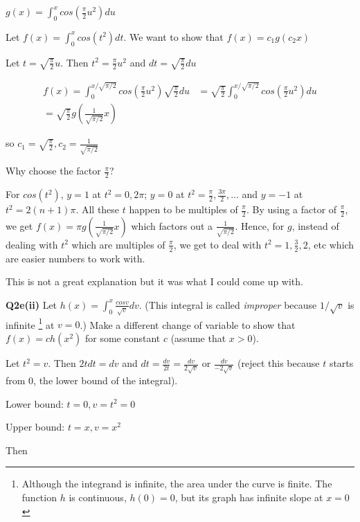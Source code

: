 \documentclass[9pt]{article}
\begin{document}
$g(x) = \int_{0}^{x} cos(\frac{\pi}{2}u^2) du$

Let $f(x) = \int_0^{x} cos(t^2) dt$. We want to show that $f(x) = c_1g(c_2x)$

Let $t = \sqrt{\frac{\pi}{2}} u$. Then $t^2 = \frac{\pi}{2}u^2$ and $dt = \sqrt{\frac{\pi}{2}} du$

\begin{align*}
  f(x) = \int_0^{x / \sqrt{\pi/2}} cos(\frac{\pi}{2}u^2) \sqrt{\frac{\pi}{2}} du &= \sqrt{\frac{\pi}{2}} \int_0^{x / \sqrt{\pi / 2}} cos(\frac{\pi}{2} u^2) du \\
  = \sqrt{\frac{\pi}{2}} g(\frac{1}{\sqrt{\pi / 2}} x)
\end{align*}

so $c_1 = \sqrt{\frac{\pi}{2}}, c_2 = \frac{1}{\sqrt{\pi / 2}}$

Why choose the factor $\frac{\pi}{2}$?

For $cos(t^2)$, $y = 1$ at $t^2 = 0, 2\pi$; $y = 0$ at $t^2 = \frac{\pi}{2}, \frac{3\pi}{2}, ...$ and $y = -1$ at $t^2 = 2(n+1)\pi$. All these $t$ happen to be multiples of $\frac{\pi}{2}$. By using a factor of $\frac{\pi}{2}$, we get $f(x) = \pi g(\frac{1}{\sqrt{\pi / 2}} x)$ which factors out a $\frac{1}{\sqrt{\pi / 2}}$. Hence, for $g$, instead of dealing with $t^2$ which are multiples of $\frac{\pi}{2}$, we get to deal with $t^2 = 1, \frac{3}{2}, 2$, etc which are easier numbers to work with.

This is not a great explanation but it was what I could come up with.


\begin{tcolorbox}
  \textbf{Q2e(ii)} Let $h(x) = \int_0^x \frac{cos v}{\sqrt{v}} dv$. (This integral is called \emph{improper} because $1 / \sqrt{v}$ is infinite \footnote{Although the integrand is infinite, the area under the curve is finite. The function $h$ is continuous, $h(0) = 0$, but its graph has infinite slope at $x = 0$} at $v = 0$.) Make a different change of variable to show that $f(x) = ch(x^2)$ for some constant $c$ (assume that $x > 0$).
\end{tcolorbox}

Let $t^2 = v$. Then $2t dt = dv$ and $dt = \frac{dv}{2t} = \frac{dv}{2\sqrt{v}}$ or $\frac{dv}{-2\sqrt{v}}$ (reject this because $t$ starts from 0, the lower bound of the integral).

Lower bound: $t = 0, v = t^2 = 0$

Upper bound: $t = x, v = x^2$

Then
\end{document}
